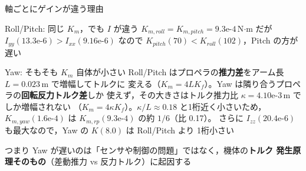 \begin{frame}{軸ごとにゲインが違う理由\later}
  \begin{exampleblock}{Roll/Pitch: 同じ $K_m$，でも $I$ が違う}\footnotesize
    $K_{m,roll}=K_{m,pitch}=9.3\text{e-}4$\,N$\cdot$m だが $I_{yy}(13.3\text{e-}6) > I_{xx}(9.16\text{e-}6)$
    なので $K_{pitch}(70) < K_{roll}(102)$，Pitch の方が遅い
  \end{exampleblock}

  \vspace{0.3em}

  \begin{alertblock}{Yaw: そもそも $K_m$ 自体が小さい}\footnotesize
    Roll/Pitch はプロペラの\textbf{推力差}をアーム長 $L=0.023$\,m で増幅してトルクに
    変える（$K_m=4LK_f$）。Yaw は隣り合うプロペラの\textbf{回転反力トルク差}しか
    使えず，その大きさはトルク推力比 $\kappa=4.10\text{e-}3$\,m でしか増幅されない
    （$K_m=4\kappa K_f$）。$\kappa/L\approx0.18$ と1桁近く小さいため，
    $K_{m,yaw}(1.6\text{e-}4)$ は $K_{m,rp}(9.3\text{e-}4)$ の約 $1/6$（比 0.17）。
    さらに $I_{zz}(20.4\text{e-}6)$ も最大なので，Yaw の $K(8.0)$ は Roll/Pitch より
    1桁小さい
  \end{alertblock}

  \vspace{0.3em}

  {\footnotesize つまり Yaw が遅いのは「センサや制御の問題」ではなく，機体の\textbf{トルク
  発生原理そのもの}（差動推力 vs 反力トルク）に起因する}
\end{frame}


